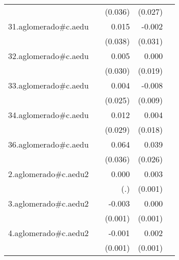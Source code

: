 {\begin{longtable}{l*{4}{D{.}{.}{-1}}}
            &                     &     (0.036)         &     (0.027)         &                     \\
\addlinespace
31.aglomerado#c.aedu&                     &       0.015         &      -0.002         &                     \\
            &                     &     (0.038)         &     (0.031)         &                     \\
\addlinespace
32.aglomerado#c.aedu&                     &       0.005         &       0.000         &                     \\
            &                     &     (0.030)         &     (0.019)         &                     \\
\addlinespace
33.aglomerado#c.aedu&                     &       0.004         &      -0.008         &                     \\
            &                     &     (0.025)         &     (0.009)         &                     \\
\addlinespace
34.aglomerado#c.aedu&                     &       0.012         &       0.004         &                     \\
            &                     &     (0.029)         &     (0.018)         &                     \\
\addlinespace
36.aglomerado#c.aedu&                     &       0.064         &       0.039         &                     \\
            &                     &     (0.036)         &     (0.026)         &                     \\
\addlinespace
2.aglomerado#c.aedu2&                     &       0.000         &       0.003\sym{***}&                     \\
            &                     &         (.)         &     (0.001)         &                     \\
\addlinespace
3.aglomerado#c.aedu2&                     &      -0.003\sym{*}  &       0.000         &                     \\
            &                     &     (0.001)         &     (0.001)         &                     \\
\addlinespace
4.aglomerado#c.aedu2&                     &      -0.001         &       0.002\sym{***}&                     \\
            &                     &     (0.001)         &     (0.001)         &                     \\

\end{longtable}}
